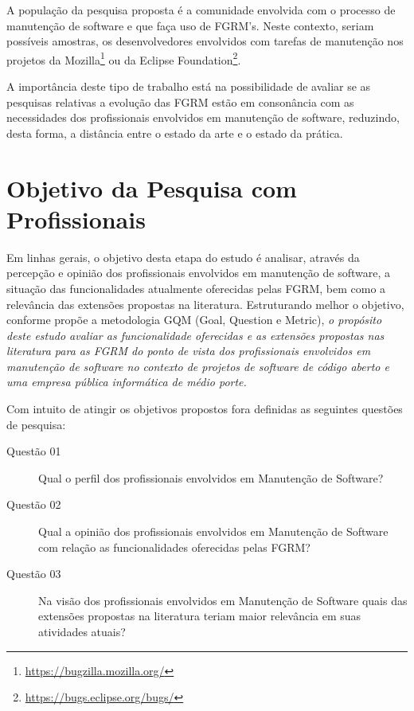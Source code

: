 A população da pesquisa proposta é a comunidade envolvida com o processo de
manutenção de software e que faça uso de FGRM's. Neste contexto, seriam
possíveis amostras, os desenvolvedores envolvidos com tarefas de manutenção nos
projetos da Mozilla\footnote{\url{https://bugzilla.mozilla.org/}} ou da Eclipse
Foundation\footnote{\url{https://bugs.eclipse.org/bugs/}}.

A importância deste tipo de trabalho está na possibilidade de avaliar se as
pesquisas relativas a evolução das FGRM estão em consonância com as necessidades
dos profissionais envolvidos em manutenção de software, reduzindo, desta forma,
a distância entre o estado da arte e o estado da prática.  

\section{Objetivo da Pesquisa com Profissionais}
\label{sec:objetivo_da_pesquisa_com_profissionais}
Em linhas gerais, o objetivo desta etapa do estudo é analisar, através da
percepção e opinião dos profissionais envolvidos em manutenção de software, a
situação das funcionalidades atualmente oferecidas pelas FGRM, bem como a
relevância das extensões propostas na literatura. Estruturando melhor o
objetivo, conforme propõe a metodologia GQM (Goal, Question e Metric)\cite{gqm},
\textit{o propósito deste estudo avaliar as funcionalidade oferecidas e as
	extensões propostas nas literatura para as FGRM do ponto de vista dos
	profissionais envolvidos em manutenção de software no contexto de projetos
	de software de código aberto e uma empresa pública informática de médio
	porte.}  

Com intuito de atingir os objetivos propostos fora definidas as seguintes
questões de pesquisa:
\begin{description}
	\item[Questão 01] Qual o perfil dos profissionais envolvidos em Manutenção
		de Software?
	\item[Questão 02] Qual a opinião dos profissionais envolvidos em Manutenção
		de Software com relação as funcionalidades oferecidas pelas FGRM\@?
	\item [Questão 03] Na visão  dos profissionais envolvidos em Manutenção de Software quais das
		extensões propostas na literatura teriam maior relevância em suas atividades atuais?
\end{description}

